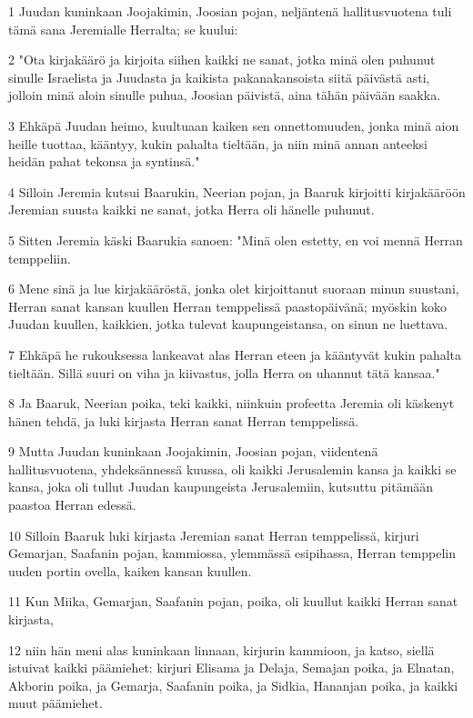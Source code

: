\par 1 Juudan kuninkaan Joojakimin, Joosian pojan, neljäntenä hallitusvuotena tuli tämä sana Jeremialle Herralta; se kuului:
\par 2 "Ota kirjakäärö ja kirjoita siihen kaikki ne sanat, jotka minä olen puhunut sinulle Israelista ja Juudasta ja kaikista pakanakansoista siitä päivästä asti, jolloin minä aloin sinulle puhua, Joosian päivistä, aina tähän päivään saakka.
\par 3 Ehkäpä Juudan heimo, kuultuaan kaiken sen onnettomuuden, jonka minä aion heille tuottaa, kääntyy, kukin pahalta tieltään, ja niin minä annan anteeksi heidän pahat tekonsa ja syntinsä."
\par 4 Silloin Jeremia kutsui Baarukin, Neerian pojan, ja Baaruk kirjoitti kirjakääröön Jeremian suusta kaikki ne sanat, jotka Herra oli hänelle puhunut.
\par 5 Sitten Jeremia käski Baarukia sanoen: "Minä olen estetty, en voi mennä Herran temppeliin.
\par 6 Mene sinä ja lue kirjakääröstä, jonka olet kirjoittanut suoraan minun suustani, Herran sanat kansan kuullen Herran temppelissä paastopäivänä; myöskin koko Juudan kuullen, kaikkien, jotka tulevat kaupungeistansa, on sinun ne luettava.
\par 7 Ehkäpä he rukouksessa lankeavat alas Herran eteen ja kääntyvät kukin pahalta tieltään. Sillä suuri on viha ja kiivastus, jolla Herra on uhannut tätä kansaa."
\par 8 Ja Baaruk, Neerian poika, teki kaikki, niinkuin profeetta Jeremia oli käskenyt hänen tehdä, ja luki kirjasta Herran sanat Herran temppelissä.
\par 9 Mutta Juudan kuninkaan Joojakimin, Joosian pojan, viidentenä hallitusvuotena, yhdeksännessä kuussa, oli kaikki Jerusalemin kansa ja kaikki se kansa, joka oli tullut Juudan kaupungeista Jerusalemiin, kutsuttu pitämään paastoa Herran edessä.
\par 10 Silloin Baaruk luki kirjasta Jeremian sanat Herran temppelissä, kirjuri Gemarjan, Saafanin pojan, kammiossa, ylemmässä esipihassa, Herran temppelin uuden portin ovella, kaiken kansan kuullen.
\par 11 Kun Miika, Gemarjan, Saafanin pojan, poika, oli kuullut kaikki Herran sanat kirjasta,
\par 12 niin hän meni alas kuninkaan linnaan, kirjurin kammioon, ja katso, siellä istuivat kaikki päämiehet: kirjuri Elisama ja Delaja, Semajan poika, ja Elnatan, Akborin poika, ja Gemarja, Saafanin poika, ja Sidkia, Hananjan poika, ja kaikki muut päämiehet.
